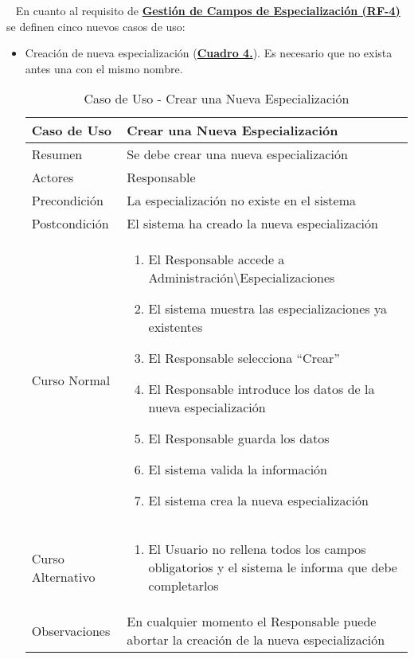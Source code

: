 \newpage~
En cuanto al requisito de \textbf{\hyperref[tab:rfGestEspec]{Gestión de Campos de Especialización (RF-4)}} se definen cinco nuevos casos de uso:
\begin{itemize}
	\item \addtocounter{tabla}{1} Creación de nueva especialización (\textbf{\hyperref[tab:curCrearEspec]{Cuadro 4.}}). Es necesario que no exista antes una con el mismo nombre.
		\begin{table}[!htbp]
		  \centering  \addtocounter{casouso}{1}
		  \begin{tabular}{|l | p{100mm}|}
		    \textbf{Caso de Uso}  & \textbf{Crear una Nueva Especialización} \\ \hline
		    Resumen 		 & Se debe crear una nueva especialización \\ \hline
		    Actores  		 & Responsable \\ \hline
		    Precondición  	 & La especialización no existe en el sistema  \\ \hline
		    Postcondición  	 & El sistema ha creado la nueva especialización \\ \hline
		    Curso Normal   	 & \begin{enumerate}
			  \item El Responsable accede a Administración\textbackslash Especializaciones
			  \item El sistema muestra las especializaciones ya existentes
			  \item El Responsable selecciona ``Crear''
			  \item El Responsable introduce los datos de la nueva especialización
			  \item El Responsable guarda los datos
			  \item El sistema valida la información
			  \item El sistema crea la nueva especialización
		    \end{enumerate}  \\ \hline
		    Curso Alternativo  & \begin{enumerate}
			  \item El Usuario no rellena todos los campos obligatorios y el sistema le informa que debe completarlos
		    \end{enumerate}  \\ \hline
		    Observaciones 	 & En cualquier momento el Responsable puede abortar la creación de la nueva especialización  \\ 		\hline
		  \end{tabular}
		  \caption{Caso de Uso  - Crear una Nueva Especialización }
		  \label{tab:curCrearEspec}
		\end{table}
		\FloatBarrier
	

\end{itemize}
